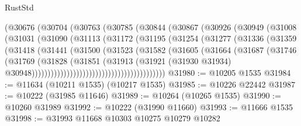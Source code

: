 \begin{lexlean}{RustStd}
\begin{coremodule}
                        (@30676
                          (@30704
                            (@30763
                              (@30785
                                (@30844
                                  (@30867
                                    (@30926
                                      (@30949
                                        (@31008
                                          (@31031
                                            (@31090
                                              (@31113
                                                (@31172
                                                  (@31195
                                                    (@31254
                                                      (@31277
                                                        (@31336
                                                          (@31359
                                                            (@31418
                                                              (@31441
                                                                (@31500
                                                                  (@31523
                                                                    (@31582
                                                                      (@31605
                                                                        (@31664
                                                                          (@31687
                                                                            (@31746
                                                                              (@31769
                                                                                (@31828
                                                                                  (@31851
                                                                                    (@31913
                                                                                      (@31921
                                                                                        (@31930
                                                                                          @31934)
                                                                                        @30948))))))))))))))))))))))))))))))))))))))))))
@31980 := @10205 @1535
@31984 := @11634 (@10211 @1535) (@10217 @1535)
@31985 := @10226 @22442
@31987 := @10222 (@31985 @11646)
@31989 := @10264 (@10265 @1535)
@31990 := @10260 @31989
@31992 := @10222 (@31990 @11660)
@31993 := @11666 @1535
@31998 := @31993 @11668 @10303 @10275 @10279 @10282

\end{coremodule}
\end{lexlean}
